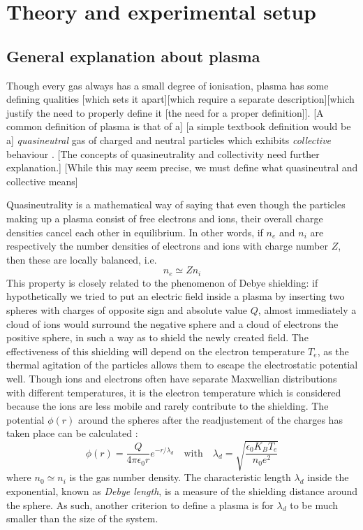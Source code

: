 \section{Theory and experimental setup}

\subsection{General explanation about plasma}
Though every gas always has a small degree of ionisation, plasma has some defining qualities [which sets it apart][which require a separate description][which justify the need to properly define it [the need for a proper definition]].
[A common definition of plasma is that of a] [a simple textbook definition would be a] \emph{quasineutral} gas of charged and neutral particles which exhibits \emph{collective} behaviour \cite{chen_introduction_2006}.
[The concepts of quasineutrality and collectivity need further explanation.]
[While this may seem precise, we must define what quasineutral and collective means]

Quasineutrality is a mathematical way of saying that even though the particles making up a plasma consist of free electrons and ions, 
their overall charge densities cancel each other in equilibrium\cite{gibbon_introduction_2016}.
In other words, if $n_e$ and $n_i$ are respectively the number densities of electrons and ions with charge number $Z$, then these are locally balanced, i.e.
\begin{equation}
    n_e \simeq Z n_i
\end{equation}
This property is closely related to the phenomenon of Debye shielding:
if hypothetically we tried to put an electric field inside a plasma by inserting two spheres with charges of opposite sign and absolute value $Q$, almost immediately a cloud of ions would surround the negative sphere and a cloud of electrons the positive sphere, in such a way as to shield the newly created field.
The effectiveness of this shielding will depend on the electron temperature $T_e$, as the thermal agitation of the particles allows them to escape the electrostatic potential well.
Though ions and electrons often have separate Maxwellian distributions with different temperatures, it is the electron temperature which is considered because the ions are less mobile and rarely contribute to the shielding\cite{chen_introduction_2006}.
The potential $\phi(r)$ around the spheres after the readjustement of the charges has taken place can be calculated \cite{sanjines_notice_2014}:
\begin{equation}
    \phi(r) = \frac{Q}{4\pi \epsilon_0 r} e^{-r / \lambda_d} \quad \mathrm{with} \quad \lambda_d = \sqrt{\frac{\epsilon_0 K_B T_e}{n_0 e^2}}
\end{equation}
where $n_0 \simeq n_i$ is the gas number density\cite{gibbon_introduction_2016}.
The characteristic length $\lambda_d$ inside the exponential, known as \emph{Debye length}, is a measure of the shielding distance around the sphere.
As such, another criterion to define a plasma is for $\lambda_d$ to be much smaller than the size of the system.

